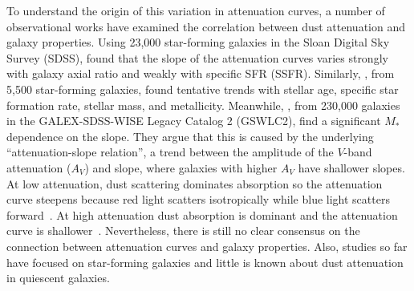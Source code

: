 To understand the origin of this variation in attenuation curves, a number of
observational  works have examined the correlation between dust attenuation and
galaxy properties. Using 23,000 star-forming galaxies in the Sloan Digital
Sky Survey (SDSS), \cite{wild2011} found that the slope of the attenuation
curves varies strongly with galaxy axial ratio and weakly with specific SFR (SSFR).
Similarly, \cite{battisti2017}, from 5,500 star-forming galaxies, found tentative
trends with stellar age, specific star formation rate, stellar mass, and
metallicity. Meanwhile, \cite{salim2018}, from 230,000 galaxies in the
GALEX-SDSS-WISE Legacy Catalog 2 (GSWLC2), find a significant $M_*$ 
dependence on the slope. They argue that this is caused by the underlying 
``attenuation-slope relation'', a trend between the amplitude of the 
$V$-band attenuation ($A_V$) and slope, where galaxies with higher $A_V$ have
shallower slopes.
At low attenuation, dust scattering dominates absorption so the 
attenuation curve steepens because red light scatters isotropically while blue light
scatters forward~\citep{gordon1994, witt2000, draine2003}. %
At high attenuation dust absorption is dominant and the attenuation curve is
shallower~\citep{chevallard2013}. 
Nevertheless, there is still no clear consensus on the
connection between attenuation curves and galaxy properties. Also, studies 
so far have focused on star-forming galaxies and little is known
about dust attenuation in quiescent galaxies. 

